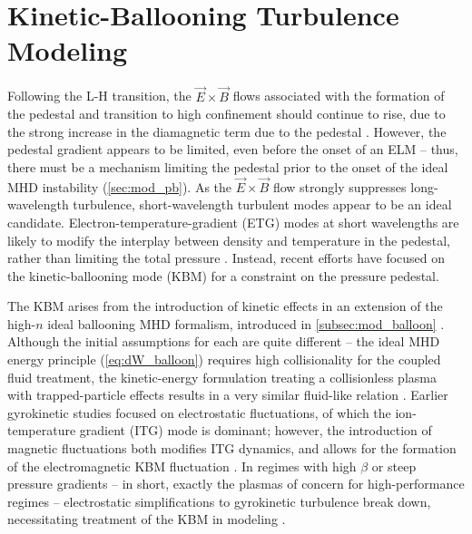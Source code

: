 \section{Kinetic-Ballooning Turbulence Modeling}\label{sec:mod_turbulence}

Following the L-H transition, the $\vec{E}\times\vec{B}$ flows associated with the formation of the pedestal and transition to high confinement should continue to rise, due to the strong increase in the diamagnetic term due to the pedestal \cite{Snyder2009}.  However, the pedestal gradient appears to be limited, even before the onset of an ELM \cite{Maggi2010} -- thus, there must be a mechanism limiting the pedestal prior to the onset of the ideal MHD instability (\cref{sec:mod_pb}).  As the $\vec{E}\times\vec{B}$ flow strongly suppresses long-wavelength turbulence, short-wavelength turbulent modes appear to be an ideal candidate.  Electron-temperature-gradient (ETG) modes at short wavelengths are likely to modify the interplay between density and temperature in the pedestal, rather than limiting the total pressure \cite{Snyder2009}.  Instead, recent efforts have focused on the kinetic-ballooning mode (KBM) for a constraint on the pressure pedestal.

The KBM arises from the introduction of kinetic effects in an extension of the high-$n$ ideal ballooning MHD formalism, introduced in \cref{subsec:mod_balloon} \cite{Tang1980}.  Although the initial assumptions for each are quite different -- the ideal MHD energy principle (\cref{eq:dW_balloon}) requires high collisionality for the coupled fluid treatment, the kinetic-energy formulation treating a collisionless plasma with trapped-particle effects results in a very similar fluid-like relation \cite{Tang1980}.  Earlier gyrokinetic studies focused on electrostatic fluctuations, of which the ion-temperature gradient (ITG) mode is dominant; however, the introduction of magnetic fluctuations both modifies ITG dynamics, and allows for the formation of the electromagnetic KBM fluctuation \cite{Snyder2001}.  In regimes with high $\beta$ or steep pressure gradients -- in short, exactly the plasmas of concern for high-performance regimes -- electrostatic simplifications to gyrokinetic turbulence break down, necessitating treatment of the KBM in modeling \cite{Snyder1999,Snyder2001}.

